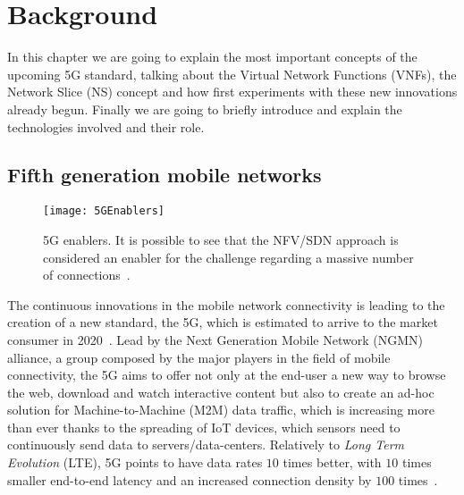 \chapter{Background}
\label{chap:background}

In this chapter we are going to explain the most important concepts of the
upcoming 5G standard, talking about the Virtual Network Functions (VNFs), the
Network Slice (NS) concept and how first experiments with these new innovations
already begun. Finally we are going to briefly introduce and explain the
technologies involved and their role.

\section{Fifth generation mobile networks}

\begin{figure}[t]
  \centering
  \texttt{[image: 5GEnablers]}
  \caption[5G enablers]{5G enablers. It is possible to see that the NFV/SDN
    approach is considered an enabler for the challenge regarding a massive
    number of connections~\cite{agyapong2014design}.}
  \label{chap:background:sec:5G:img:enablers}
\end{figure}

The continuous innovations in the mobile network connectivity is leading to the
creation of a new standard, the 5G, which is estimated to arrive to the market
consumer in 2020~\cite{iwamura2015ngmn}. Lead by the Next Generation Mobile
Network (NGMN) alliance, a group composed by the major players in the field of
mobile connectivity, the 5G aims to offer not only at the end-user a new way to
browse the web, download and watch interactive content but also to create an
ad-hoc solution for Machine-to-Machine (M2M) data traffic, which is increasing
more than ever thanks to the spreading of IoT devices, which sensors need to
continuously send data to servers/data-centers. Relatively to \emph{Long Term
  Evolution} (LTE), 5G points to have data rates $10$ times better, with $10$
times smaller end-to-end latency and an increased connection density by $100$
times~\cite{alliance20155g}.

